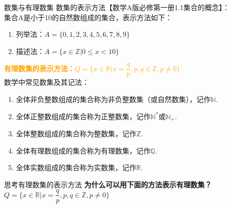 \documentclass[aspectratio=169]{ctexbeamer} %
\begin{document}


\begin{frame}{数集与有理数集}
数集的表示方法【数学A版必修第一册1.1集合的概念】：\\
集合A是小于10的自然数组成的集合，表示方法如下：\\
\begin{enumerate}[label={\arabic*.}]
\item 列举法：$A = \{0, 1, 2, 3, 4, 5, 6, 7, 8, 9\}$
\item 描述法：$A = \{x \in \mathbb{Z} | 0 \leq x < 10\}$
\end{enumerate}
\textbf{\textcolor{orange}{有理数集的表示方法：$Q = \{ x \in \mathbb{R} | x = \dfrac{q}{p}, p,q \in \mathbb{Z}, p \neq 0\} $ }}\\
数学中常见数集及其记法：
\begin{enumerate}[itemsep=6pt,label={\arabic*.}]
\item 全体非负整数组成的集合称为非负整数集（或自然数集），记作$\mathbb{N}$.
\item 全体正整数组成的集合称为正整数集，记作$\mathbb{N}^*$或$\mathbb{N}_+$.
\item 全体整数组成的集合称为整数集，记作$\mathbb{Z}$.
\item 全体有理数组成的集合称为有理数集，记作$\mathbb{Q}$.
\item 全体实数组成的集合称为实数集，记作$\mathbb{R}$.
\end{enumerate}

\end{frame}

\begin{frame}{思考有理数集的表示方法}
\textbf{为什么可以用下面的方法表示有理数集？ }\\
\vspace{12pt}
$Q = \{ x \in \mathbb{R} | x = \dfrac{q}{p}, p,q \in \mathbb{Z}, p \neq 0\} $
\vspace{5cm}

\end{frame}
\end{document}
